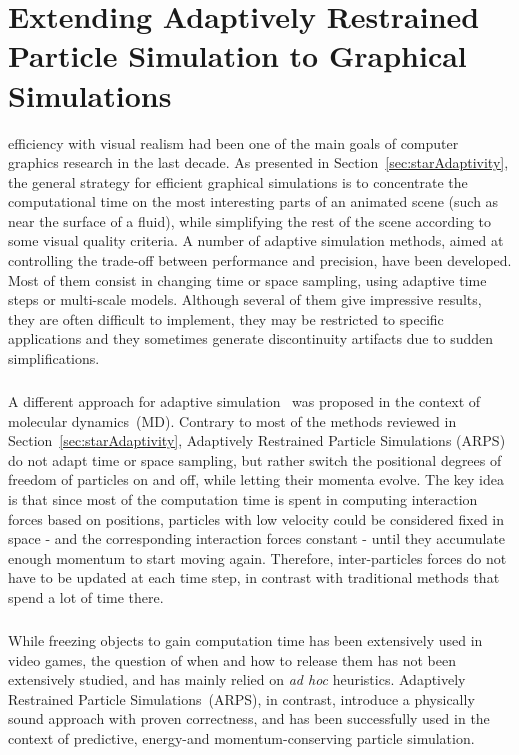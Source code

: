 \chapter[Extending ARPS to Graphical Simulations]{Extending Adaptively Restrained Particle Simulation to Graphical Simulations}
\label{chap:arps}

 efficiency with visual realism had been one of the main goals of computer graphics research in the last decade. As presented in Section~\ref{sec:starAdaptivity}, the general strategy for efficient graphical simulations is to concentrate the computational time on the most interesting parts of an animated scene (such as near the surface of a fluid), while simplifying the rest of the scene according to some visual quality criteria.  A number of adaptive simulation methods, aimed at controlling the trade-off between performance and precision, have been developed. Most of them consist in changing time or space sampling, using adaptive time steps or multi-scale models.
Although several of them give impressive results, they are often difficult to implement, they may be restricted to specific applications and they sometimes generate discontinuity artifacts due to sudden simplifications.
\paragraph*{}
A different approach for adaptive simulation~\cite{Artemova2012} was proposed in the context of molecular dynamics~(MD). Contrary to most of the methods reviewed in Section~\ref{sec:starAdaptivity}, Adaptively Restrained Particle Simulations (ARPS) do not adapt time or space sampling, but rather switch the positional degrees of freedom of particles on and off, while letting their momenta evolve. The key idea is that since most of the computation time is spent in computing interaction forces based on positions, particles with low velocity could be considered fixed in space - and the corresponding interaction forces constant - until they accumulate enough momentum to start moving again. Therefore, inter-particles forces do not have to be updated at each time step, in contrast with traditional methods that spend a lot of time there.
\paragraph*{}
While freezing objects to gain computation time has been extensively used in video games, the question of when and how to release them has not been extensively studied, and has mainly relied on \textit{ad hoc} heuristics.
Adaptively Restrained Particle Simulations~(ARPS), in contrast, introduce a physically sound approach with proven correctness, and has been successfully used in the context of predictive, energy-and momentum-conserving particle simulation.
